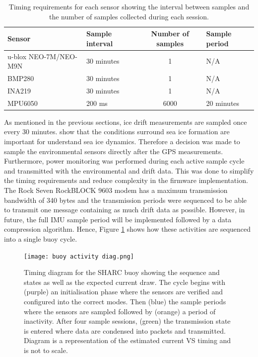 \begin{table}[H]
	\centering
	\caption{Timing requirements for each sensor showing the interval between samples and the number of samples collected during each session.}
	\label{tab:sensor_timing}
	\setlength{\extrarowheight}{5pt}
	\tiny
	\begin{tabular}{llcl}
		\hline
		\textbf{Sensor}& \textbf{Sample interval} & \textbf{Number of samples} & \textbf{Sample period}\\
		\hline
		\hline
		u-blox NEO-7M/NEO-M9N & 30 minutes & 1 & N/A\\

		BMP280 & 30 minutes & 1 & N/A\\

		INA219 & 30 minutes & 1 & N/A \\

		MPU6050 & 200 ms & 6000 & 20 minutes\\
		\hline
		\hline
	\end{tabular}
\end{table}
As mentioned in the previous sections, ice drift measurements are sampled once every 30 minutes. \textcite{vichi2019effects,alberello2019drift} show that the conditions surround sea ice formation are important for understand sea ice dynamics. Therefore a decision was made to sample the environmental sensors directly after the GPS measurements. Furthermore, power monitoring was performed during each active sample cycle and transmitted with the environmental and drift data. This was done to simplify the timing requirements and reduce complexity in the firmware implementation. The Rock Seven RockBLOCK 9603 modem has a maximum transmission bandwidth of 340 bytes and the transmission periods were sequenced to be able to transmit one message containing as much drift data as possible. However, in future, the full IMU sample period will be implemented followed by a data compression algorithm. Hence, Figure \ref{fig:buoyactivity diagram} shows how these activities are sequenced into a single buoy cycle.

\begin{figure}[H]
	\centering
	\texttt{[image: buoy activity diag.png]}
	\caption{Timing diagram for the SHARC buoy showing the sequence and states as well as the expected current draw. The cycle begins with (purple) an initialisation phase where the sensors are verified and configured into the correct modes. Then (blue) the sample periods where the sensors are sampled followed by (orange) a period of inactivity. After four sample sessions, (green) the transmission state is entered where data are condensed into packets and transmitted. Diagram is a representation of the estimated current VS timing and is not to scale. }
	\label{fig:buoyactivity diagram}
\end{figure}

